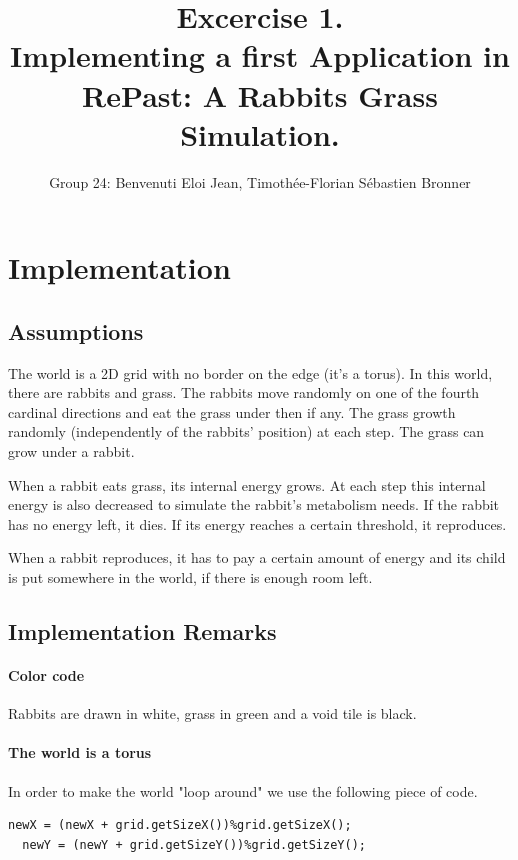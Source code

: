 \documentclass[11pt]{article}
\title{\bf Excercise 1.\\ Implementing a first Application in RePast: A Rabbits Grass Simulation.}
\author{Group 24: Benvenuti Eloi Jean, Timothée-Florian S\'ebastien Bronner}
\begin{document}
\lstset{language=java}
\maketitle

\section{Implementation}

\subsection{Assumptions}
The world is a 2D grid with no border on the edge (it's a torus). In this world, there are rabbits and grass. The rabbits move randomly on one of the fourth cardinal directions and eat the grass under then if any. The grass growth randomly (independently of the rabbits' position) at each step. The grass can grow under a rabbit.

When a rabbit eats grass, its internal energy grows. At each step this internal energy is also decreased to simulate the rabbit's metabolism needs. If the rabbit has no energy left, it dies. If its energy reaches a certain threshold, it reproduces.

When a rabbit reproduces, it has to pay a certain amount of energy and its child is put somewhere in the world, if there is enough room left.

\subsection{Implementation Remarks}
\paragraph{Color code} Rabbits are drawn in white, grass in green and a void tile is black.

\paragraph{The world is a torus} In order to make the world "loop around" we use the following piece of code.
\begin{lstlisting}[frame=single]
  newX = (newX + grid.getSizeX())%grid.getSizeX();
  newY = (newY + grid.getSizeY())%grid.getSizeY();
\end{lstlisting}
\end{document}

